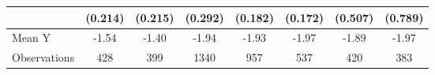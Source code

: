 {\begin{tabular}{l*{7}{c}}
            &     (0.214)         &     (0.215)         &     (0.292)         &     (0.182)         &     (0.172)         &     (0.507)         &     (0.789)         \\
\midrule
Mean Y      &       -1.54         &       -1.40         &       -1.94         &       -1.93         &       -1.97         &       -1.89         &       -1.97         \\
Observations&         428         &         399         &        1340         &         957         &         537         &         420         &         383         \\
\bottomrule
\end{tabular}
}
